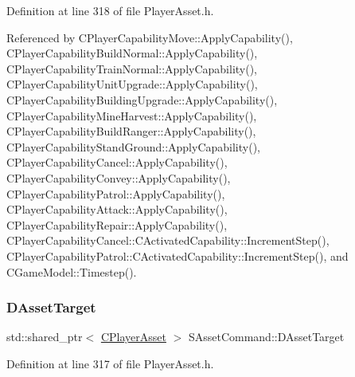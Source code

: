 Definition at line 318 of file Player\+Asset.\+h.



Referenced by C\+Player\+Capability\+Move\+::\+Apply\+Capability(), C\+Player\+Capability\+Build\+Normal\+::\+Apply\+Capability(), C\+Player\+Capability\+Train\+Normal\+::\+Apply\+Capability(), C\+Player\+Capability\+Unit\+Upgrade\+::\+Apply\+Capability(), C\+Player\+Capability\+Building\+Upgrade\+::\+Apply\+Capability(), C\+Player\+Capability\+Mine\+Harvest\+::\+Apply\+Capability(), C\+Player\+Capability\+Build\+Ranger\+::\+Apply\+Capability(), C\+Player\+Capability\+Stand\+Ground\+::\+Apply\+Capability(), C\+Player\+Capability\+Cancel\+::\+Apply\+Capability(), C\+Player\+Capability\+Convey\+::\+Apply\+Capability(), C\+Player\+Capability\+Patrol\+::\+Apply\+Capability(), C\+Player\+Capability\+Attack\+::\+Apply\+Capability(), C\+Player\+Capability\+Repair\+::\+Apply\+Capability(), C\+Player\+Capability\+Cancel\+::\+C\+Activated\+Capability\+::\+Increment\+Step(), C\+Player\+Capability\+Patrol\+::\+C\+Activated\+Capability\+::\+Increment\+Step(), and C\+Game\+Model\+::\+Timestep().

\hypertarget{structSAssetCommand_a3d9b43f6e59c386c48c41a65448a0c39}{}\label{structSAssetCommand_a3d9b43f6e59c386c48c41a65448a0c39} 
\subsubsection{\texorpdfstring{D\+Asset\+Target}{DAssetTarget}}
{\footnotesize\ttfamily std\+::shared\+\_\+ptr$<$ \hyperlink{classCPlayerAsset}{C\+Player\+Asset} $>$ S\+Asset\+Command\+::\+D\+Asset\+Target}



Definition at line 317 of file Player\+Asset.\+h.



